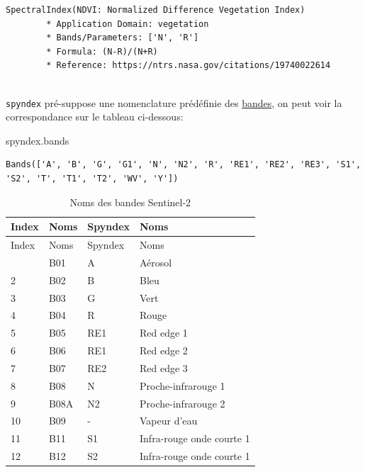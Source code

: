 \documentclass[
  11pt,
  letterpaper,
  open=any,
  twoside=false,
  french]{scrbook}
\newenvironment{Shaded}{\begin{snugshade}}{\end{snugshade}}
\newcommand{\NormalTok}[1]{\textcolor[rgb]{0.00,0.23,0.31}{#1}}
\begin{document}
\begin{verbatim}
SpectralIndex(NDVI: Normalized Difference Vegetation Index)
        * Application Domain: vegetation
        * Bands/Parameters: ['N', 'R']
        * Formula: (N-R)/(N+R)
        * Reference: https://ntrs.nasa.gov/citations/19740022614
        
\end{verbatim}

\texttt{spyndex} pré-suppose une nomenclature prédéfinie des
\href{https://awesome-ee-spectral-indices.readthedocs.io/en/latest/\#expressions}{bandes},
on peut voir la correspondance sur le tableau ci-dessous:

\begin{Shaded}
\begin{Highlighting}[]
\NormalTok{spyndex.bands}
\end{Highlighting}
\end{Shaded}

\begin{verbatim}
Bands(['A', 'B', 'G', 'G1', 'N', 'N2', 'R', 'RE1', 'RE2', 'RE3', 'S1', 'S2', 'T', 'T1', 'T2', 'WV', 'Y'])
\end{verbatim}

\begin{longtable}[]{@{}llll@{}}
\caption{Noms des bandes Sentinel-2}\tabularnewline
\toprule\noalign{}
Index & Noms & Spyndex & Noms \\
\midrule\noalign{}
\endfirsthead
\toprule\noalign{}
Index & Noms & Spyndex & Noms \\
\midrule\noalign{}
\endhead
\bottomrule\noalign{}
\endlastfoot
1 & B01 & A & Aérosol \\
2 & B02 & B & Bleu \\
3 & B03 & G & Vert \\
4 & B04 & R & Rouge \\
5 & B05 & RE1 & Red edge 1 \\
6 & B06 & RE1 & Red edge 2 \\
7 & B07 & RE2 & Red edge 3 \\
8 & B08 & N & Proche-infrarouge 1 \\
9 & B08A & N2 & Proche-infrarouge 2 \\
10 & B09 & - & Vapeur d'eau \\
11 & B11 & S1 & Infra-rouge onde courte 1 \\
12 & B12 & S2 & Infra-rouge onde courte 1 \\
\end{longtable}
\end{document}

